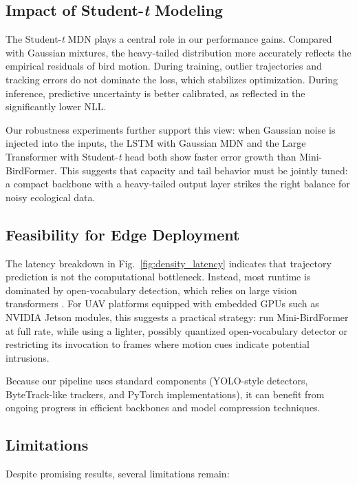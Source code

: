 \documentclass[journal]{IEEEtran}
\begin{document}
	\subsection{Impact of Student-\textit{t} Modeling}
	
	The Student-\textit{t} MDN plays a central role in our performance gains. Compared with Gaussian mixtures, the heavy-tailed distribution more accurately reflects the empirical residuals of bird motion. During training, outlier trajectories and tracking errors do not dominate the loss, which stabilizes optimization. During inference, predictive uncertainty is better calibrated, as reflected in the significantly lower NLL.
	
	Our robustness experiments further support this view: when Gaussian noise is injected into the inputs, the LSTM with Gaussian MDN and the Large Transformer with Student-\textit{t} head both show faster error growth than Mini-BirdFormer. This suggests that capacity and tail behavior must be jointly tuned: a compact backbone with a heavy-tailed output layer strikes the right balance for noisy ecological data.
	
	\subsection{Feasibility for Edge Deployment}
	
	The latency breakdown in Fig.~\ref{fig:density_latency} indicates that trajectory prediction is not the computational bottleneck. Instead, most runtime is dominated by open-vocabulary detection, which relies on large vision transformers \cite{Dosovitskiy2021ViT,Minderer2022OWLViT}. For UAV platforms equipped with embedded GPUs such as NVIDIA Jetson modules, this suggests a practical strategy: run Mini-BirdFormer at full rate, while using a lighter, possibly quantized open-vocabulary detector or restricting its invocation to frames where motion cues indicate potential intrusions.
	
	Because our pipeline uses standard components (YOLO-style detectors, ByteTrack-like trackers, and PyTorch implementations), it can benefit from ongoing progress in efficient backbones \cite{Howard2017MobileNet,He2016ResNet} and model compression techniques.
	
	\subsection{Limitations}
	
	Despite promising results, several limitations remain:
	
\end{document}
